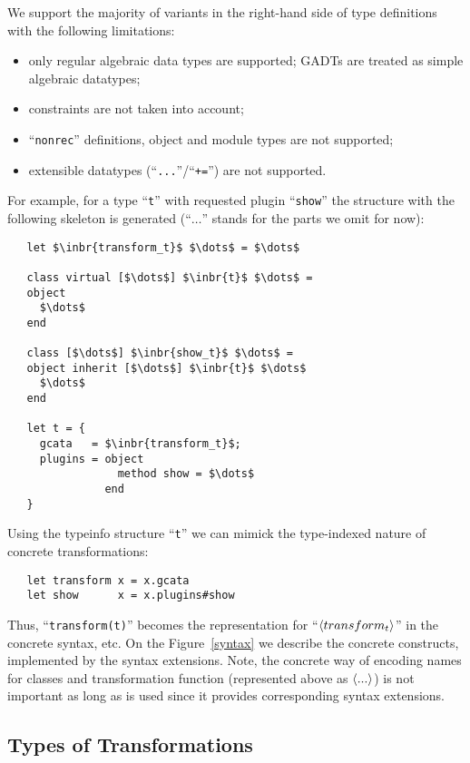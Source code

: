 We support the majority of variants in the right-hand side of type definitions with the following limitations:

\begin{itemize}
\item only regular algebraic data types are supported; GADTs are treated as simple algebraic datatypes;
\item constraints are not taken into account;
\item ``\lstinline{nonrec}'' definitions, object and module types are not supported;
\item extensible datatypes (``\lstinline{...}''/``\lstinline{+=}'') are not supported.
\end{itemize}

For example, for a type ``\lstinline{t}'' with requested plugin ``\lstinline{show}'' the structure with the following skeleton is generated (``$\dots$'' stands for the parts we omit for now):

\begin{lstlisting}
   let $\inbr{transform_t}$ $\dots$ = $\dots$
   
   class virtual [$\dots$] $\inbr{t}$ $\dots$ =
   object
     $\dots$
   end

   class [$\dots$] $\inbr{show_t}$ $\dots$ =
   object inherit [$\dots$] $\inbr{t}$ $\dots$
     $\dots$
   end

   let t = {
     gcata   = $\inbr{transform_t}$;
     plugins = object
                 method show = $\dots$
               end
   }
\end{lstlisting}

Using the typeinfo structure ``\lstinline{t}'' we can mimick the type-indexed nature of concrete transformations:

\begin{lstlisting}
   let transform x = x.gcata
   let show      x = x.plugins#show
\end{lstlisting}

Thus, ``\lstinline{transform(t)}'' becomes the representation for ``$\left<transform_t\right>$'' in the concrete syntax, etc. On the
Figure~\ref{syntax} we describe the concrete constructs, implemented by the syntax extensions. Note, the concrete way of encoding names
for classes and transformation function (represented above as $\left<...\right>$) is not important as long as  is
used since it provides corresponding syntax extensions.


\subsection{Types of Transformations}

